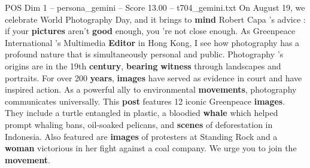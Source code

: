 \begin{textsample}{POS Dim 1 – persona\_gemini – Score 13.00 – t704\_gemini.txt}  \label{ex:f1_pos_046}
On August 19, we celebrate World Photography Day, and it brings to \textbf{mind} Robert Capa 's advice : if your \textbf{pictures} aren't \textbf{good} enough, you 're not close enough.
As Greenpeace International 's Multimedia \textbf{Editor} in Hong Kong, I see how photography has a profound nature that is simultaneously personal and public.
Photography 's origins are in the 19th \textbf{century}, \textbf{bearing} \textbf{witness} through landscapes and portraits.
For over 200 \textbf{years}, \textbf{images} have served as evidence in court and have inspired action.
As a powerful ally to environmental \textbf{movements}, photography communicates universally.
This \textbf{post} features 12 iconic Greenpeace \textbf{images}.
They include a turtle entangled in plastic, a bloodied \textbf{whale} which helped prompt whaling bans, oil-soaked pelicans, and \textbf{scenes} of deforestation in Indonesia.
Also featured are \textbf{images} of protesters at Standing Rock and a \textbf{woman} victorious in her fight against a coal company.
We urge you to join the \textbf{movement}.

\end{textsample}

